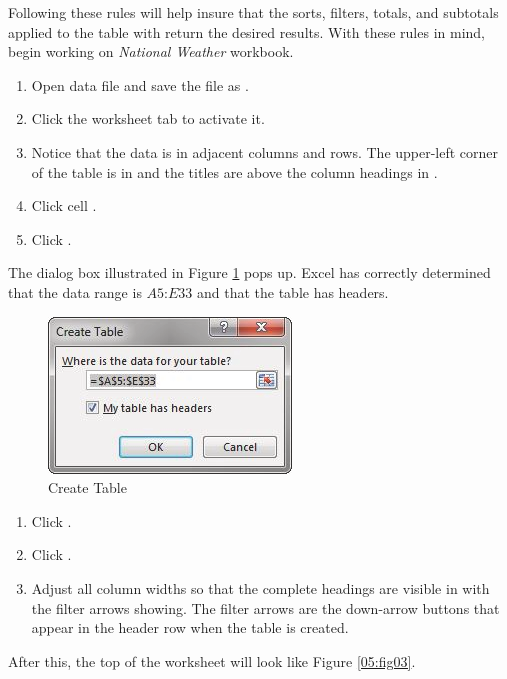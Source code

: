 Following these rules will help insure that the sorts, filters, totals, and subtotals applied to the table with return the desired results. With these rules in mind, begin working on \textit{National Weather} workbook. 

\begin{enumerate}
	\item Open data file  and save the file as .
	\item Click the  worksheet tab to activate it.
	\item Notice that the data is in adjacent columns and rows. The upper-left corner of the table is in  and the titles are above the column headings in .
	\item Click cell .
	\item Click .
\end{enumerate}

The dialog box illustrated in Figure \ref{05:fig02} pops up. Excel has correctly determined that the data range is $ A5 $:$ E33 $ and that the table has headers.

\begin{figure}[H]
	\centering
	\includegraphics[width=\maxwidth{.95\linewidth}]{gfx/ch05_fig02}
	\caption{Create Table}
	\label{05:fig02}
\end{figure}

\begin{enumerate}[resume]
	\item Click .
	\item Click .
	\item Adjust all column widths so that the complete headings are visible in  with the filter arrows showing. The filter arrows are the down-arrow buttons that appear in the header row when the table is created. 
\end{enumerate}

After this, the top of the worksheet will look like Figure \ref{05:fig03}.

